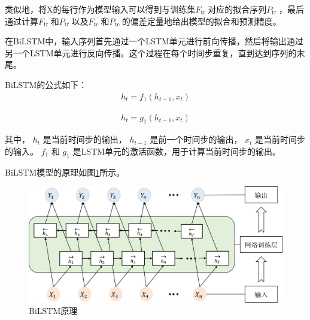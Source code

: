 \documentclass[bwprint]{gmcmthesis}
\begin{document}
类似地，将X的每行作为模型输入可以得到与训练集$F_{\text {tr }}$对应的拟合序列$P_{\text {tr }}$，最后通过计算$F_{\text {tr }}$和$P_{\text {tr }}$以及$F_{\text {te }}$和$P_{\text {te }}$的偏差定量地给出模型的拟合和预测精度。

在BiLSTM中，输入序列首先通过一个LSTM单元进行前向传播，然后将输出通过另一个LSTM单元进行反向传播。这个过程在每个时间步重复，直到达到序列的末尾。

BiLSTM的公式如下：
\begin{equation}
\begin{aligned}
h_t=f_1\left(h_{t-1}, x_t\right)
\end{aligned}
\label{equ:17}
\end{equation}

\begin{equation}
\begin{aligned}
h_t=g_1\left(h_{t-1}, x_t\right)
\end{aligned}
\label{equ:18}
\end{equation}

其中， $h_t$ 是当前时间步的输出， $h_{t-1}$ 是前一个时间步的输出， $x_t$ 是当前时间步的输入。 $f_1$ 和 $g_1$ 是LSTM单元的激活函数，用于计算当前时间步的输出。

BiLSTM模型的原理如图\ref{fig:BiLSTM原理}所示。
\begin{figure}[h]
    \centering
    \includegraphics[width = \linewidth]{figures/BiLSTM原理图.png}
    \caption{BiLSTM原理}
    \label{fig:BiLSTM原理}
\end{figure}
\end{document}
